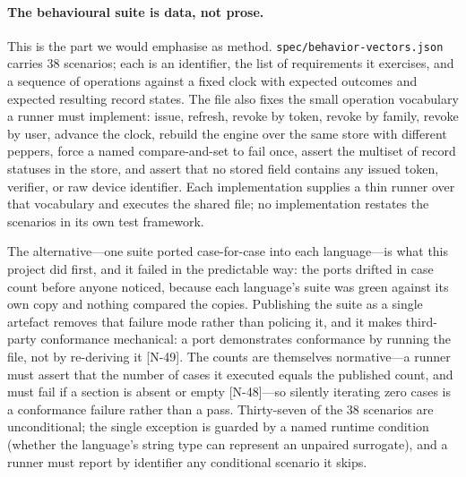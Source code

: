 \documentclass[11pt]{article}
\begin{document}
\paragraph{The behavioural suite is data, not prose.} This is the part we
would emphasise as method. \texttt{spec/behavior-vectors.json} carries 38
scenarios; each is an identifier, the list of requirements it exercises, and
a sequence of operations against a fixed clock with expected outcomes and
expected resulting record states. The file also fixes the small operation
vocabulary a runner must implement: issue, refresh, revoke by token, revoke
by family, revoke by user, advance the clock, rebuild the engine over the
same store with different peppers, force a named compare-and-set to fail
once, assert the multiset of record statuses in the store, and assert that no
stored field contains any issued token, verifier, or raw device identifier.
Each implementation supplies a thin runner over that vocabulary and executes
the shared file; no implementation restates the scenarios in its own test
framework.

The alternative---one suite ported case-for-case into each language---is
what this project did first, and it failed in the predictable way: the ports
drifted in case count before anyone noticed, because each language's suite
was green against its own copy and nothing compared the copies. Publishing
the suite as a single artefact removes that failure mode rather than
policing it, and it makes third-party conformance mechanical: a port
demonstrates conformance by running the file, not by re-deriving it [N-49].
The counts are themselves normative---a runner must assert that the number
of cases it executed equals the published count, and must fail if a section
is absent or empty [N-48]---so silently iterating zero cases is a
conformance failure rather than a pass. Thirty-seven of the 38 scenarios are
unconditional; the single exception is guarded by a named runtime condition
(whether the language's string type can represent an unpaired surrogate),
and a runner must report by identifier any conditional scenario it skips.
\end{document}
